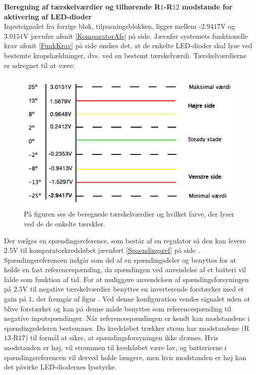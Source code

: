 \noindent\textbf{Beregning af tærskelværdier og tilhørende R$1$-R$12$ modstande for aktivering af LED-dioder} \\
Inputsignalet fra forrige blok, tilpasningsblokken, ligger mellem -$2.9417$V og $3.0151$V jævnfør afsnit \ref{KomparatorAfs} på side\pageref{KomparatorAfs}. Jævnfør systemets funktionelle krav afsnit \ref{FunkKrav} på side \pageref{FunkKrav} ønskes det, at de enkelte LED-dioder skal lyse ved bestemte kropshældninger, dvs. ved en bestemt tærskelværdi. 
Tærskelværdierne er udregnet til at være:
\begin{figure}[H]
	\centering
	\includegraphics[scale=0.5]{figures/cProblemloesning/Taerskelvaerdier.PNG}
	\caption{På figuren ses de beregnede tærskelværdier og hvilket farve, der lyser ved de de enkelte tærskler.}
	\label{fig:taerskelvaerdier}
\end{figure}

Der vælges en  spændingsreference, som består af en regulator så den kan levere $2.5$V til komparatorkredsløbet jævnført \ref{Spaendingsref} på side \pageref{Spaendingsref}. Spændingsreferencen indgår som del af en spændingsdeler og benyttes for at holde en fast referencespænding, da spændingen ved anvendelse af et batteri vil falde som funktion af tid. For at muliggøre anvendelsen af spændingsforsyningen på $2.5$V til negative tærskelværdier benyttes en inverterende forstærker med et gain på $1$, der fremgår af figur . Ved denne konfiguration vendes signalet uden at blive forstærket og kan på denne måde benyttes som referencespænding til negative inputspændinger.  
Når referencespændingen er kendt kan modstandene i spændingsdeleren bestemmes. Da kredsløbet trækker strøm har modstandene (R$13$-R$17$) til formål at sikre, at spændingsforsyningen ikke drænes. Hvis modstanden er høj, vil strømmen til kredsløbet være lav, og batterierne i spændingsreferencen vil derved holde længere, men hvis modstanden er høj kan det påvirke LED-diodernes lysstyrke.

